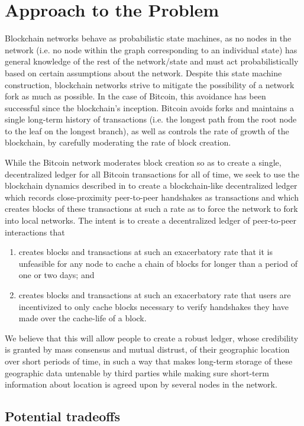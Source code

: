 \documentclass{article}
\begin{document}
\section*{Approach to the Problem}
Blockchain networks behave as probabilistic state machines, as no nodes in the
network (i.e. no node within the graph corresponding to an individual state) has
general knowledge of the rest of the network/state and must act probabilistically
based on certain assumptions about the network\cite{saito_2016}. Despite this
state machine construction, blockchain networks strive to mitigate the
possibility of a network fork as much as possible. In the case of Bitcoin, this
avoidance has been successful since the blockchain's inception\cite{decker_2013}.
Bitcoin avoids forks and maintains a single long-term history of transactions
(i.e. the longest path from the root node to the leaf on the longest branch), as
well as controls the rate of growth of the blockchain, by carefully moderating
the rate of block creation.

While the Bitcoin network moderates block creation so as to create a single,
decentralized ledger for all Bitcoin transactions for all of time, we seek to use
the blockchain dynamics described in \cite{decker_2013} to create a
blockchain-like decentralized ledger which records close-proximity peer-to-peer
handshakes as transactions and which creates blocks of these transactions at such
a rate as to force the network to fork into local networks. The intent is to
create a decentralized ledger of peer-to-peer interactions that
\begin{enumerate}
	\item creates blocks and transactions at such an exacerbatory rate that
		it is unfeasible for any node to cache a chain of blocks for
		longer than a period of one or two days; and
	\item creates blocks and transactions at such an exacerbatory rate that
		users are incentivized to only cache blocks necessary to verify
		handshakes they have made over the cache-life of a block.
\end{enumerate}
We believe that this will allow people to create a robust ledger, whose
credibility is granted by mass consensus and mutual distrust, of their geographic location
over short periods of time, in such a way that makes long-term storage of these
geographic data untenable by third parties while making sure short-term
information about location is agreed upon by several nodes in the network.

\subsection*{Potential tradeoffs}
\end{document}
